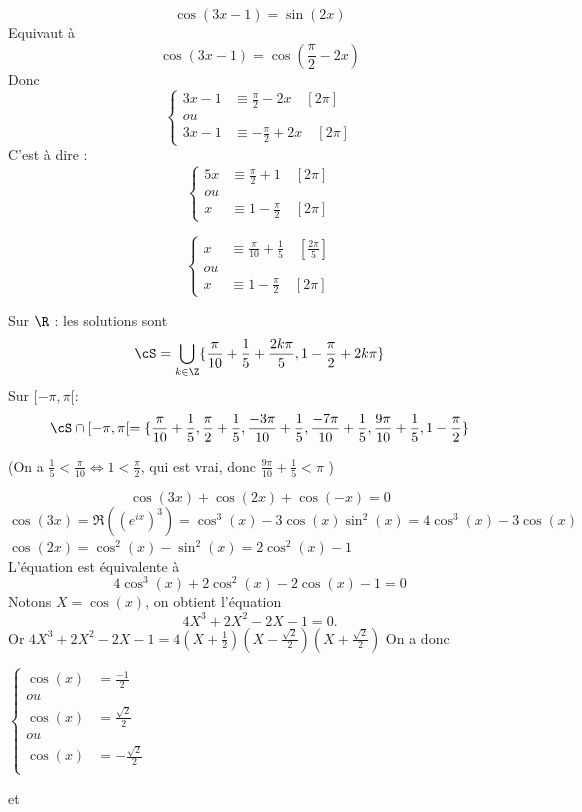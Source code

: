 \begin{correction}
$$\cos(3x-1)=\sin(2x)$$
Equivaut à 
$$\cos(3x-1)=\cos(\frac{\pi}{2}-2x)$$
Donc 
$$\left\{ \begin{array}{cc}
3x-1&\equiv \frac{\pi}{2}-2x\quad [2\pi]\\
ou &\\
3x-1&\equiv -\frac{\pi}{2}+2x\quad [2\pi]
\end{array}\right.$$
C'est à dire : 
$$\left\{ \begin{array}{cc}
5x&\equiv \frac{\pi}{2}+1\quad [2\pi]\\
ou &\\
x&\equiv 1-\frac{\pi}{2}\quad [2\pi]
\end{array}\right.$$

$$\left\{ \begin{array}{cc}
x&\equiv \frac{\pi}{10}+\frac{1}{5}\quad [\frac{2\pi}{5}]\\
ou &\\
x&\equiv 1-\frac{\pi}{2}\quad [2\pi]
\end{array}\right.$$






Sur $\R $ : les solutions sont $$\cS=\bigcup_{k\in \Z} \{ \frac{\pi}{10}+\frac{1}{5} + \frac{2k\pi}{5},1-\frac{\pi}{2}+2k\pi \}$$
Sur $[-\pi, \pi[$:
$$\cS\cap [-\pi, \pi[ = \{  \frac{\pi}{10}+\frac{1}{5},  \frac{\pi}{2}+\frac{1}{5} ,  \frac{-3\pi}{10}+\frac{1}{5},  \frac{-7\pi}{10}+\frac{1}{5} ,  \frac{9\pi}{10}+\frac{1}{5}, 1-\frac{\pi}{2}\}$$


(On a $\frac{1}{5}< \frac{\pi}{10} \Longleftrightarrow 1<\frac{\pi}{2} $, qui est vrai, donc $ \frac{9\pi}{10}+\frac{1}{5}<\pi$  )

\begin{equation}\tag{(2)}
\cos(3x)+\cos(2x)+\cos(-x)=0
\end{equation}
$\cos(3x) =\Re((e^{ix})^3)=\cos^3(x) -3\cos(x)\sin^2(x)=4\cos^3(x)-3\cos(x) $\\
$\cos(2x) = \cos^2(x)-\sin^2(x)=2\cos^2(x)-1$\\
L'équation est équivalente  à 
$$4\cos^3(x)+2\cos^2(x)-2\cos(x)-1=0$$
Notons $X=\cos(x)$, on obtient l'équation 
$$4X^3+2X^2-2X-1 =0.$$
Or $4X^3+2X^2-2X-1  =4(X+\frac{1}{2}) (X-\frac{\sqrt{2}}{2})(X+\frac{\sqrt{2}}{{2}})$
On a donc 

$\left\{ \begin{array}{cc}
\cos(x)&=\frac{-1}{2}\\
ou&\\
\cos(x)&=\frac{\sqrt{2}}{2}\\
ou&\\
\cos(x)&=-\frac{\sqrt{2}}{2}\\
\end{array}\right.$


et 
\conclusion{$\cS \cap[-\pi, \pi[ =  \{ \frac{2\pi}{3}, -\frac{2\pi}{3}, \frac{\pi}{4}, -\frac{\pi}{4},\frac{3\pi}{4},-\frac{3\pi}{4} \}$}

\end{correction}
